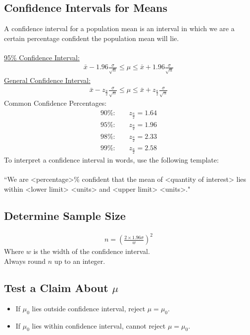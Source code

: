 \documentclass[10pt, a4paper, titlepage]{article}
\begin{document}
\begin{multicols*}{3}
\subsection{Confidence Intervals for Means}
A confidence interval for a population mean is an interval in which we are a certain percentage confident the population mean will lie.\\\\
\underline{95\% Confidence Interval:}
\begin{align}
	\bar{x}-1.96\frac{\sigma}{\sqrt{n}}\leq \mu \leq \bar{x}+1.96\frac{\sigma}{\sqrt{n}}
\end{align}
\underline{General Confidence Interval:}
\begin{align}
	\bar{x}-z_{\frac{a}{2}}\frac{\sigma}{\sqrt{n}}\leq \mu \leq \bar{x}+z_{\frac{a}{2}}\frac{\sigma}{\sqrt{n}}
\end{align}
Common Confidence Percentages:
\begin{align}
	\text{90\%:}\qquad z_{\frac{a}{2}}=1.64\\
	\text{95\%:}\qquad z_{\frac{a}{2}}=1.96\\
	\text{98\%:}\qquad z_{\frac{a}{2}}=2.33\\
	\text{99\%:}\qquad z_{\frac{a}{2}}=2.58
\end{align}
To interpret a confidence interval in words, use the following template:\\\\
``We are \textless{}percentage\textgreater{}\% confident that the mean of \textless{}quantity of interest\textgreater{} lies within \textless{}lower limit\textgreater{} \textless{}units\textgreater{} and \textless{}upper limit\textgreater{} \textless{}units\textgreater{}."\\

\dotfill
\subsection{Determine Sample Size}
\begin{align}
	n=\left(\frac{2\times 1.96\sigma}{w}\right)^2
\end{align}
Where $w$ is the width of the confidence interval.\\
Always round $n$ up to an integer.\\

\dotfill
\subsection{Test a Claim About $\mu$}
\begin{itemize}
	\item If $\mu _0$ lies outside confidence interval, reject $\mu =\mu _0$.
	\item If $\mu _0$ lies within confidence interval, cannot reject $\mu =\mu _0$.
\end{itemize}
\dotfill

\end{multicols*}
\end{document}
